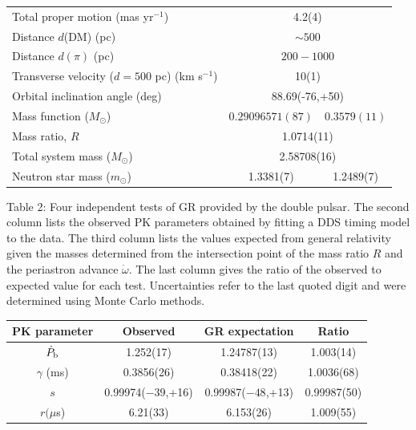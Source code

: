 \documentclass[12pt,psfig]{article}
\begin{document}
\begin{table}[ht]
\begin{center}
\begin{scriptsize}
\begin{tabular}{lcc}
Total proper motion (mas yr$^{-1}$) & \multicolumn{2}{c}{4.2(4)} \\ 
Distance $d$(DM) (pc) & \multicolumn{2}{c}{$\sim 500$} \\ 
Distance $d(\pi)$ (pc) & \multicolumn{2}{c}{$200-1000$} \\ 
Transverse velocity ($d=500$ pc) (km s$^{-1}$) & \multicolumn{2}{c}{10(1)} \\ 
Orbital inclination angle (deg) & \multicolumn{2}{c}{88.69(-76,+50)} \\ 
Mass function ($M_\odot$) &  $0.29096571(87)$ & $0.3579(11)$ \\ 
Mass ratio, $R$ &   \multicolumn{2}{c}{1.0714(11)}  \\ 
Total system mass ($M_\odot$) &   \multicolumn{2}{c}{2.58708(16)}     \\ 
Neutron star mass ($m_\odot$) & 1.3381(7) & 1.2489(7) \\
\hline
\end{tabular}
\end{scriptsize}
\end{center}
\label{tab:params}
\end{table}


\clearpage
\noindent
Table 2: Four independent tests of GR provided by the double pulsar.
The second column lists the observed PK parameters obtained by fitting
a DDS timing model to the data.  The third column lists the values
expected from general relativity given the masses determined from the
intersection point of the mass ratio $R$ and the periastron advance
$\dot{\omega}$. The last column gives the ratio of the observed to
expected value for each test. Uncertainties refer to the last quoted
digit and were determined using Monte Carlo methods.


\begin{table}[ht]
\begin{scriptsize}
\begin{center}
\begin{tabular}{cccc}
PK parameter & Observed & GR expectation & Ratio \\%
\hline
$\dot{P}_{\rm b}$ & 1.252(17) & 1.24787(13) & 1.003(14) \\%
$\gamma$ (ms) & 0.3856(26) & 0.38418(22)& 1.0036(68)    \\%
$s$ & 0.99974($-39$,+16) & 0.99987($-48$,+13) & 0.99987(50) \\%
$r(\mu$s) & 6.21(33) & 6.153(26) & 1.009(55)  \\%
\hline
\end{tabular}
\end{center}
\end{scriptsize}
\label{tab:compare}
\end{table}
\end{document}
